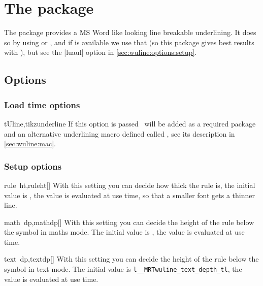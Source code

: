 \chapter{The  package}
The package provides a MS Word like looking line breakable underlining. It does
so by using  or , and if  is available we
use that (so this package gives best results with ), but see
the |luaul| option in \autoref{sec:wuline:options:setup}.

\section{Options}\label{sec:wuline:options}
\subsection{Load time options}\label{sec:wuline:options:loadtime}%
\begin{describeopt}{tUline,tikzunderline}
  If this option is passed \TikZ\ will be added as a required package and an
  alternative underlining macro defined called , see its description
  in \autoref{sec:wuline:mac}.
\end{describeopt}

\subsection{Setup options}\label{sec:wuline:options:setup}%
\begin{describeopt}{rule~ht,ruleht}[]
  With this setting you can decide how thick the rule is, the initial value is
  \texttt{}, the value is evaluated at use
  time, so that a smaller font gets a thinner line.
\end{describeopt}

\begin{describeopt}{math~dp,mathdp}[]
  With this setting you can decide the height of the rule below the symbol in
  maths mode. The initial value is
  \texttt{}, the value is evaluated at use
  time.
\end{describeopt}

\begin{describeopt}{text~dp,textdp}[]
  With this setting you can decide the height of the rule below the symbol in
  text mode. The initial value is
  \texttt{\csname l__MRTwuline_text_depth_tl\endcsname}, the value is evaluated
  at use time.
\end{describeopt}

